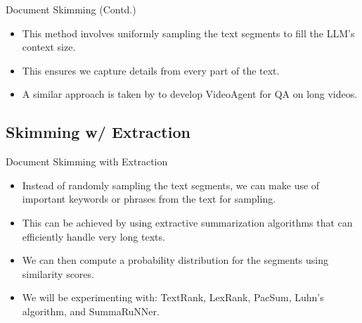 \begin{frame}{Document Skimming (Contd.)}

\begin{itemize}
	\item This method involves uniformly sampling the text segments to fill the LLM's
	context size.
	\item<3-> This ensures we capture details from every part of the text.
	\item<4> A similar approach is taken by \citet{wang2024videoagent} to develop
	VideoAgent for QA on long videos.
\end{itemize}



\end{frame}


\subsection{Skimming w/ Extraction}

\begin{frame}{Document Skimming with Extraction}

\begin{itemize}
	\item Instead of randomly sampling the text segments, we can make use of important
	keywords or phrases from the text for sampling.
	\item<2-> This can be achieved by using extractive summarization algorithms that can
	efficiently handle very long texts.
	\item<3-> We can then compute a probability distribution for the segments using
	similarity scores.
	\item<4> We will be experimenting with: TextRank, LexRank, PacSum, Luhn's algorithm,
	and SummaRuNNer.
\end{itemize}

\end{frame}


